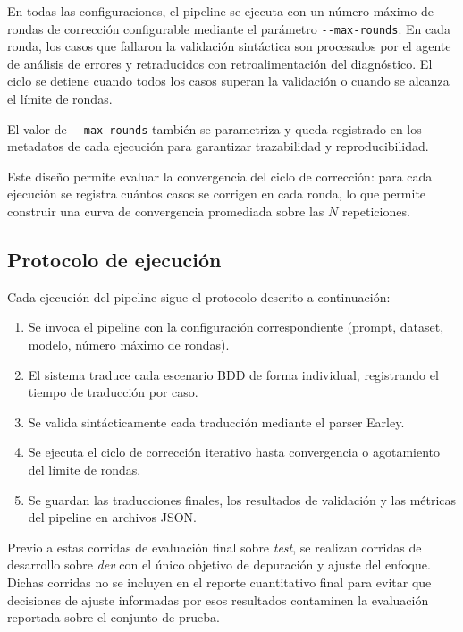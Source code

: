 En todas las configuraciones, el pipeline se ejecuta con un número máximo de rondas de corrección configurable mediante el parámetro \texttt{-{}-max-rounds}. En cada ronda, los casos que fallaron la validación sintáctica son procesados por el agente de análisis de errores y retraducidos con retroalimentación del diagnóstico. El ciclo se detiene cuando todos los casos superan la validación o cuando se alcanza el límite de rondas.

El valor de \texttt{-{}-max-rounds} también se parametriza y queda registrado en los metadatos de cada ejecución para garantizar trazabilidad y reproducibilidad.

Este diseño permite evaluar la convergencia del ciclo de corrección: para cada ejecución se registra cuántos casos se corrigen en cada ronda, lo que permite construir una curva de convergencia promediada sobre las $N$ repeticiones.

\subsection{Protocolo de ejecución}

Cada ejecución del pipeline sigue el protocolo descrito a continuación:

\begin{enumerate}
  \item Se invoca el pipeline con la configuración correspondiente (prompt, dataset, modelo, número máximo de rondas).
  \item El sistema traduce cada escenario BDD de forma individual, registrando el tiempo de traducción por caso.
  \item Se valida sintácticamente cada traducción mediante el parser Earley.
  \item Se ejecuta el ciclo de corrección iterativo hasta convergencia o agotamiento del límite de rondas.
  \item Se guardan las traducciones finales, los resultados de validación y las métricas del pipeline en archivos JSON.
\end{enumerate}

Previo a estas corridas de evaluación final sobre \textit{test}, se realizan corridas de desarrollo sobre \textit{dev} con el único objetivo de depuración y ajuste del enfoque. Dichas corridas no se incluyen en el reporte cuantitativo final para evitar que decisiones de ajuste informadas por esos resultados contaminen la evaluación reportada sobre el conjunto de prueba.

